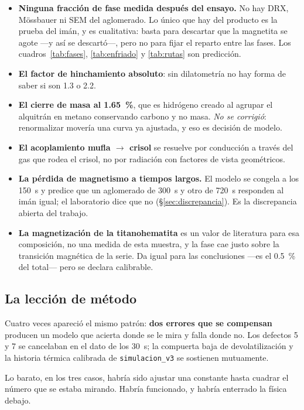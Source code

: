 \documentclass[11pt,a4paper]{article}
\newcommand{\ojo}[1]{\textcolor{aviso}{\textbf{#1}}}
\begin{document}
\begin{itemize}[leftmargin=*,itemsep=2pt]
\item \ojo{Ninguna fracción de fase medida después del ensayo.} No hay DRX,
Mössbauer ni SEM del aglomerado. Lo único que hay del producto es la prueba del
imán, y es cualitativa: basta para descartar que la magnetita se agote ---y así
se descartó---, pero no para fijar el reparto entre las fases. Los
cuadros~\ref{tab:fases}, \ref{tab:enfriado} y \ref{tab:rutas} son predicción.
\item \textbf{El factor de hinchamiento absoluto}: sin dilatometría no hay forma
de saber si son \num{1.3} o \num{2.2}.
\item \textbf{El cierre de masa al \qty{1.65}{\percent}}, que es hidrógeno creado
al agrupar el alquitrán en metano conservando carbono y no masa. \emph{No se
corrigió}: renormalizar movería una curva ya ajustada, y eso es decisión de
modelo.
\item \textbf{El acoplamiento mufla $\rightarrow$ crisol} se resuelve por
conducción a través del gas que rodea el crisol, no por radiación con factores de
vista geométricos.
\item \ojo{La pérdida de magnetismo a tiempos largos.} El modelo se congela a
los \SI{150}{\second} y predice que un aglomerado de \SI{300}{\second} y otro de
\SI{720}{\second} responden al imán igual; el laboratorio dice que no
(\S\ref{sec:discrepancia}). Es la discrepancia abierta del trabajo.
\item \textbf{La magnetización de la titanohematita} es un valor de literatura
para esa composición, no una medida de esta muestra, y la fase cae justo sobre
la transición magnética de la serie. Da igual para las conclusiones —es el
\qty{0.5}{\percent} del total— pero se declara calibrable.
\end{itemize}

\subsection{La lección de método}

Cuatro veces apareció el mismo patrón: \textbf{dos errores que se compensan}
producen un modelo que acierta donde se le mira y falla donde no. Los defectos 5
y 7 se cancelaban en el dato de los \SI{30}{\second}; la compuerta baja de
devolatilización y la historia térmica calibrada de \texttt{simulacion\_v3} se
sostienen mutuamente.

Lo barato, en los tres casos, habría sido ajustar una constante hasta cuadrar el
número que se estaba mirando. Habría funcionado, y habría enterrado la física
debajo.
\end{document}
